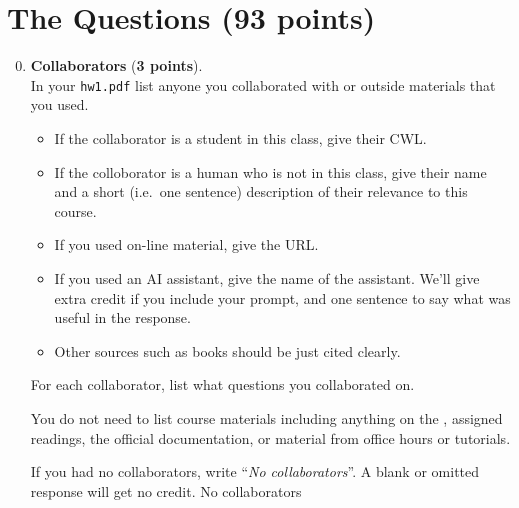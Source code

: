 \documentclass{article}
\newenvironment{answer}
{\color{blue}}
{\normalfont}
\begin{document}
\section{The Questions (93 points)}
\begin{enumerate}\setcounter{enumi}{-1}
  \item \textbf{Collaborators} (\textbf{3 points}).\label{q:collab}\\
    In your \texttt{hw1.pdf} list anyone you collaborated with or outside materials that you used.
    \begin{itemize}
      \item If the collaborator is a student in this class, give their CWL.
      \item If the colloborator is a human who is not in this class, give their name
	and a short (i.e.\ one sentence) description of their relevance to this course.
      \item If you used on-line material, give the URL.
      \item If you used an AI assistant, give the name of the assistant.
	We'll give extra credit if you include your prompt, and one sentence to say
	what was useful in the response.
      \item Other sources such as books should be just cited clearly.
    \end{itemize}
    For each collaborator, list what questions you collaborated on.
    \par
    You do not need to list course materials including anything on the 
    ,
    assigned readings, the official  documentation,
    or material from office hours or tutorials.
    \par
    If you had no collaborators, write ``\textit{No collaborators}''.
    A blank or omitted response will get no credit.
    \begin{answer}
      No collaborators
    \end{answer}


\end{enumerate}
\end{document}
